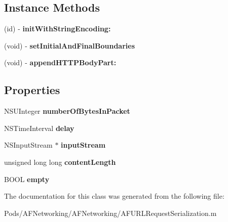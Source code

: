 \subsection*{Instance Methods}
\begin{DoxyCompactItemize}
\item 
\mbox{\label{interface_a_f_multipart_body_stream_ad574aa0595950246138a1eba40083bd6}} 
(id) -\/ {\bfseries init\+With\+String\+Encoding\+:}
\item 
\mbox{\label{interface_a_f_multipart_body_stream_acb7e1157e8d26b767eb6eff0f950d21f}} 
(void) -\/ {\bfseries set\+Initial\+And\+Final\+Boundaries}
\item 
\mbox{\label{interface_a_f_multipart_body_stream_aa51ac96df564e3876544e75af738d64f}} 
(void) -\/ {\bfseries append\+H\+T\+T\+P\+Body\+Part\+:}
\end{DoxyCompactItemize}
\subsection*{Properties}
\begin{DoxyCompactItemize}
\item 
\mbox{\label{interface_a_f_multipart_body_stream_a4f5df6b4fa6024d8bbedf72f2bef974d}} 
N\+S\+U\+Integer {\bfseries number\+Of\+Bytes\+In\+Packet}
\item 
\mbox{\label{interface_a_f_multipart_body_stream_aabbac8502bef80a07707380ebadb2791}} 
N\+S\+Time\+Interval {\bfseries delay}
\item 
\mbox{\label{interface_a_f_multipart_body_stream_a4df6d43d9551415f2a633d7de248508e}} 
N\+S\+Input\+Stream $\ast$ {\bfseries input\+Stream}
\item 
\mbox{\label{interface_a_f_multipart_body_stream_aaee3ebc73e6cade317c7524089880b3d}} 
unsigned long long {\bfseries content\+Length}
\item 
\mbox{\label{interface_a_f_multipart_body_stream_ae9b2a8f4b9b328d29f0b7c64410577c9}} 
B\+O\+OL {\bfseries empty}
\end{DoxyCompactItemize}


The documentation for this class was generated from the following file\+:\begin{DoxyCompactItemize}
\item 
Pods/\+A\+F\+Networking/\+A\+F\+Networking/A\+F\+U\+R\+L\+Request\+Serialization.\+m\end{DoxyCompactItemize}
